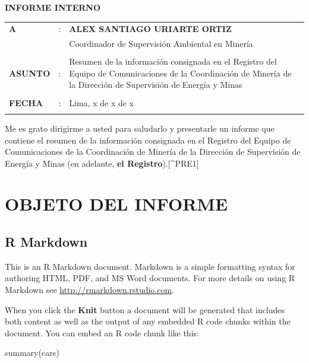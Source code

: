 \documentclass[
  9.5pt,
  a4paper,
  oneside]{article}
\author{}
\date{\vspace{-2.5em}}
\newenvironment{Shaded}{\begin{snugshade}}{\end{snugshade}}
\newcommand{\FunctionTok}[1]{\textcolor[rgb]{0.00,0.00,0.00}{#1}}
\newcommand{\NormalTok}[1]{#1}
\begin{document}
\vspace{0mm}
\centerline{\textbf{INFORME INTERNO}}
\vspace{3mm}
\begin{tabular}
{ p{1.65cm}  p{0.2cm}  p{12.85cm} }
\textbf{A} & : & \textbf{ALEX SANTIAGO URIARTE ORTIZ}\\
& & Coordinador de Supervisión Ambiental en Minería \\
& & \\
\textbf{ASUNTO} & : & Resumen de la información consignada en el Registro del Equipo de Comunicaciones de la Coordinación de Minería de la Dirección de Supervisión de Energía y Minas\\
& & \\
\textbf{FECHA} & : & Lima, x de x de x \\
& & \\
\hline
\end{tabular}
\vspace{1mm}
\normalsize
\setlength{\parskip}{10px}

Me es grato dirigirme a usted para saludarlo y presentarle un informe
que contiene el resumen de la información consignada en el Registro del
Equipo de Comunicaciones de la Coordinación de Minería de la Dirección
de Supervisión de Energía y Minas (en adelante, \textbf{el
Registro}).{[}\^{}PRE1{]}

\hypertarget{objeto-del-informe}{%
\section{OBJETO DEL INFORME}\label{objeto-del-informe}}

\hypertarget{r-markdown}{%
\subsection{R Markdown}\label{r-markdown}}

This is an R Markdown document. Markdown is a simple formatting syntax
for authoring HTML, PDF, and MS Word documents. For more details on
using R Markdown see \url{http://rmarkdown.rstudio.com}.

When you click the \textbf{Knit} button a document will be generated
that includes both content as well as the output of any embedded R code
chunks within the document. You can embed an R code chunk like this:

\begin{Shaded}
\begin{Highlighting}[]
\FunctionTok{summary}\NormalTok{(cars)}
\end{Highlighting}
\end{Shaded}
\end{document}
